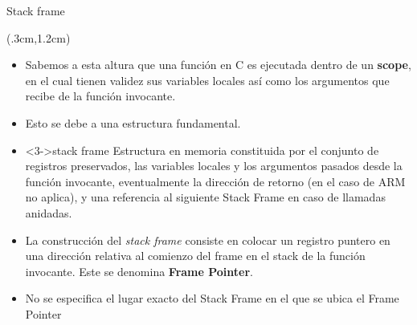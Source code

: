 \documentclass[usenames,table,dvipsnames,aspectratio=169]{beamer}
\begin{document}
\begin{frame}{Stack frame}
 \begin{textblock*}{\textwidth}(.3cm,1.2cm)
  \begin{itemize}[<+(1)->] \justifying
   \item Sabemos a esta altura que una función en C es ejecutada dentro de un \textbf{scope}, en el cual tienen validez sus variables locales así como los argumentos que recibe de la función invocante.
   \item Esto se debe a una estructura fundamental.
   \item[] \begin{block}<3->{stack frame}
    \justifying Estructura en memoria constituida por el conjunto de registros preservados, las variables locales y los argumentos pasados desde la función invocante, eventualmente la dirección de retorno (en el caso de ARM no aplica), y una referencia al siguiente Stack Frame en caso de llamadas anidadas.
    \end{block}
   \vspace{-0.5cm}
   \item La construcción del \emph{stack frame} consiste en colocar un registro puntero en una dirección relativa al comienzo del frame en el stack de la función invocante. Este se denomina \textbf{Frame Pointer}.
   \item No se especifica el lugar exacto del Stack Frame en el que se ubica el Frame Pointer
  \end{itemize}
 \end{textblock*}
\end{frame}
\end{document}
